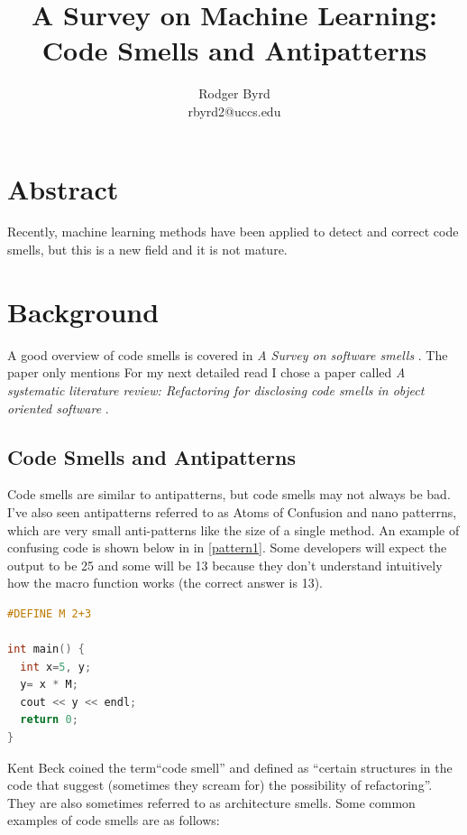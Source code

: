 \documentclass[conference]{IEEEtran}
\begin{document}

\title{A Survey on Machine Learning: Code Smells and Antipatterns}
\author{Rodger Byrd\\rbyrd2@uccs.edu}

\maketitle

\section{Abstract}
Recently, machine learning methods have been applied to detect and correct code smells, but this is a new field and it is not mature.

\section{Background}
A good overview of code smells is covered in \textit{A Survey on software smells} \cite{sharma_survey_2018}. 
The paper only mentions For my next detailed read I chose a paper called  \textit{A systematic literature review: Refactoring for disclosing code smells in object oriented software} \cite{singh_systematic_2018}. 



\subsection{Code Smells and Antipatterns}
Code smells are similar to antipatterns, but code smells may not always be bad.
I've also seen antipatterns referred to as Atoms of Confusion \cite{gopstein_understanding_2017} and nano patterrns, which are very small anti-patterns like the size of a single method. 
An example of confusing code is shown below in in \ref{pattern1}.
Some developers will expect the output to be 25 and some will be 13 because they don't understand intuitively how the macro function works (the correct answer is 13).

\begin{lstlisting}[language=C,frame=single,caption=Example Atom of Confusion,label=pattern1]
#DEFINE M 2+3

int main() {
  int x=5, y;
  y= x * M;
  cout << y << endl;
  return 0;
}
\end{lstlisting}

Kent Beck coined the term``code smell'' \cite{fowler_refactoring:_2018} and defined as ``certain structures in the code that suggest (sometimes they scream for) the possibility of refactoring''. They are also sometimes referred to as architecture smells.
Some common examples of code smells are as follows:
\end{document}
